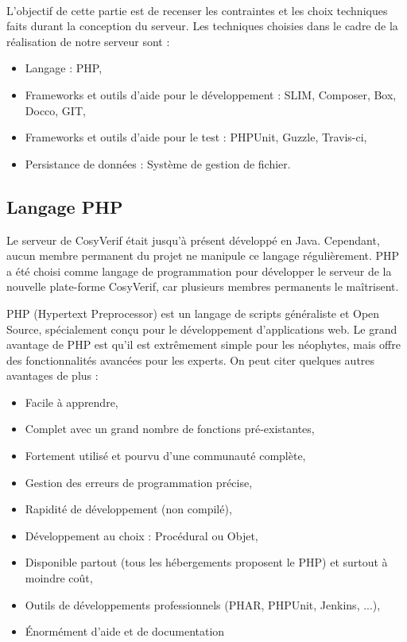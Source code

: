 \documentclass{report}
\begin{document}
\paragraph{}
L'objectif de cette partie est de recenser les contraintes et les choix
techniques faits durant la conception du serveur.
Les techniques 
choisies dans le cadre de la réalisation de notre serveur sont :
\begin{itemize}
\item Langage : PHP,
\item Frameworks et outils d'aide pour le développement : SLIM, Composer, Box, Docco, GIT,
\item Frameworks et outils d'aide pour le test : PHPUnit, Guzzle, Travis-ci,
\item Persistance de données : Système de gestion de fichier.
\end{itemize}

\subsection{Langage PHP}

Le serveur de CosyVerif était jusqu'à présent développé en Java. Cependant,
aucun membre permanent du projet ne manipule ce langage régulièrement.
PHP  a été choisi comme langage de programmation pour développer le serveur
de la nouvelle plate-forme CosyVerif, car plusieurs membres permanents le
maîtrisent.

PHP (Hypertext Preprocessor) est un langage de scripts généraliste et Open Source, spécialement conçu pour le 
développement d'applications web. Le grand avantage de PHP est qu'il est extrêmement simple pour les néophytes, 
mais offre des fonctionnalités avancées pour les experts. On peut citer quelques autres avantages de plus : 

\begin{itemize}
\item Facile à apprendre,
\item Complet avec un grand nombre de fonctions pré-existantes,
\item Fortement utilisé et pourvu d'une communauté complète,
\item Gestion des erreurs de programmation précise,
\item Rapidité de développement (non compilé),
\item Développement au choix : Procédural ou Objet,
\item Disponible partout (tous les hébergements proposent le PHP) et surtout à moindre coût,
\item Outils de développements professionnels (PHAR, PHPUnit, Jenkins, ...),
\item Énormément d'aide et de documentation
\end{itemize}
\end{document}
